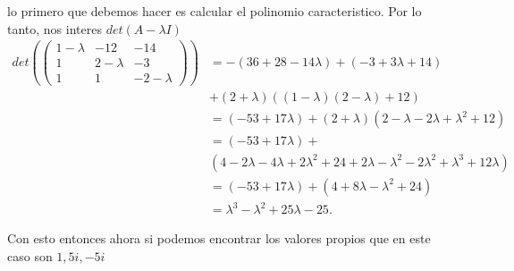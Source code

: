 \documentclass[12pt]{exam}
\begin{document}
\begin{enumerate}
\begin{enumerate}
    lo primero que debemos hacer es calcular el polinomio caracteristico. Por lo tanto, nos interes
    $det\left( A - \lambda I \right) $ 
    \begin{align*}
        det \left( \begin{pmatrix} 
                1 - \lambda & -12 & -14 \\
                1 & 2 - \lambda & -3 \\
                1 & 1 & - 2 - \lambda
        \end{pmatrix}  \right) &= -\left( 36 + 28 - 14\lambda \right) + \left( -3 + 3\lambda + 14 \right) \\
        &+ \left( 2 + \lambda \right) \left( \left( 1-\lambda \right) \left( 2 - \lambda \right) + 12 \right) \\
        &= \left( -53 + 17\lambda \right) + \left( 2 + \lambda \right) \left( 2-\lambda - 2\lambda + \lambda^2 + 12 \right) \\
        &= \left( -53 + 17\lambda \right) + \\
        & \left( 4 - 2\lambda - 4\lambda + 2\lambda^2 + 24 + 2\lambda - \lambda^2 - 2\lambda^2 + \lambda^3 + 12\lambda \right) \\
        &= \left( -53 + 17\lambda \right) + \left( 4 + 8\lambda - \lambda^2 + 24 \right)  \\
        &= \lambda^3 - \lambda^2 + 25\lambda - 25
    .\end{align*}

    Con esto entonces ahora si podemos encontrar los valores propios que en este caso son $1,5i,-5i$


\end{enumerate}
\end{enumerate}
\end{document}
